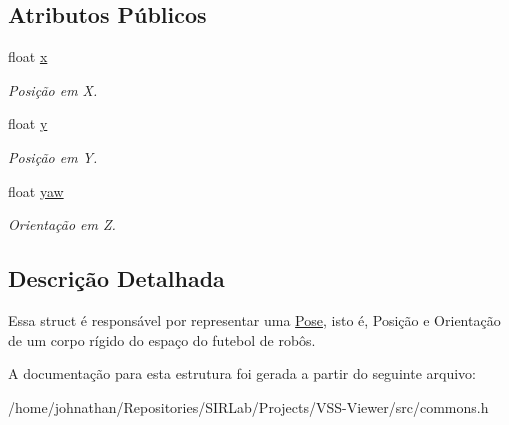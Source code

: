 \subsection*{Atributos Públicos}
\begin{DoxyCompactItemize}
\item 
float \hyperlink{structcommon_1_1Pose_a4ea360bde6890187e0a8ce0ca57fa031}{x}\hypertarget{structcommon_1_1Pose_a4ea360bde6890187e0a8ce0ca57fa031}{}\label{structcommon_1_1Pose_a4ea360bde6890187e0a8ce0ca57fa031}

\begin{DoxyCompactList}\small\item\em Posição em X. \end{DoxyCompactList}\item 
float \hyperlink{structcommon_1_1Pose_aa7debd220c3cb6f294253188045a4d0d}{y}\hypertarget{structcommon_1_1Pose_aa7debd220c3cb6f294253188045a4d0d}{}\label{structcommon_1_1Pose_aa7debd220c3cb6f294253188045a4d0d}

\begin{DoxyCompactList}\small\item\em Posição em Y. \end{DoxyCompactList}\item 
float \hyperlink{structcommon_1_1Pose_a6abb6006c34912516585beeb33077c6c}{yaw}\hypertarget{structcommon_1_1Pose_a6abb6006c34912516585beeb33077c6c}{}\label{structcommon_1_1Pose_a6abb6006c34912516585beeb33077c6c}

\begin{DoxyCompactList}\small\item\em Orientação em Z. \end{DoxyCompactList}\end{DoxyCompactItemize}


\subsection{Descrição Detalhada}
Essa struct é responsável por representar uma \hyperlink{structcommon_1_1Pose}{Pose}, isto é, Posição e Orientação de um corpo rígido do espaço do futebol de robôs. 

A documentação para esta estrutura foi gerada a partir do seguinte arquivo\+:\begin{DoxyCompactItemize}
\item 
/home/johnathan/\+Repositories/\+S\+I\+R\+Lab/\+Projects/\+V\+S\+S-\/\+Viewer/src/commons.\+h\end{DoxyCompactItemize}
